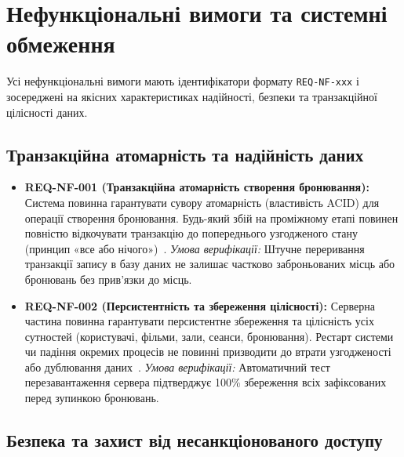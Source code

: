 \section{Нефункціональні вимоги та системні обмеження}\label{sec:nefunktsional}

Усі нефункціональні вимоги мають ідентифікатори формату \texttt{REQ-NF-xxx} і зосереджені на якісних характеристиках надійності, безпеки та транзакційної цілісності даних.

\subsection{Транзакційна атомарність та надійність даних}\label{sec:nefunktsional-atomarnist}

\begin{itemize}[leftmargin=*,labelindent=0pt]
    \item \textbf{REQ-NF-001 (Транзакційна атомарність створення бронювання):} Система повинна гарантувати сувору атомарність (властивість ACID) для операції створення бронювання. Будь-який збій на проміжному етапі повинен повністю відкочувати транзакцію до попереднього узгодженого стану (принцип «все або нічого»)~.
    \textit{Умова верифікації:} Штучне переривання транзакції запису в базу даних не залишає частково заброньованих місць або бронювань без прив'язки до місць.

    \item \textbf{REQ-NF-002 (Персистентність та збереження цілісності):} Серверна частина повинна гарантувати персистентне збереження та цілісність усіх сутностей (користувачі, фільми, зали, сеанси, бронювання). Рестарт системи чи падіння окремих процесів не повинні призводити до втрати узгодженості або дублювання даних~.
    \textit{Умова верифікації:} Автоматичний тест перезавантаження сервера підтверджує 100\% збереження всіх зафіксованих перед зупинкою бронювань.
\end{itemize}

\subsection{Безпека та захист від несанкціонованого доступу}\label{sec:nefunktsional-bezpeka}

